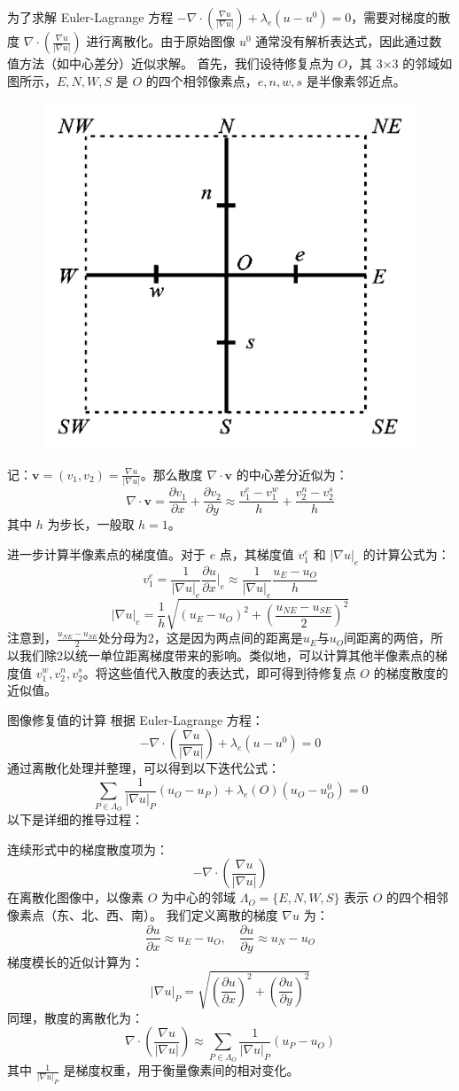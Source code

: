 \documentclass[UTF8]{ctexart}
\begin{document}
为了求解 Euler-Lagrange 方程 $-\nabla \cdot \left( \frac{\nabla u}{|\nabla u|} \right) + \lambda_e (u - u^0) = 0$，需要对梯度的散度 $\nabla \cdot \left( \frac{\nabla u}{|\nabla u|} \right)$ 进行离散化。由于原始图像 $u^0$ 通常没有解析表达式，因此通过数值方法（如中心差分）近似求解。
首先，我们设待修复点为 $O$，其 3×3 的邻域如图所示，$E, N, W, S$ 是 $O$ 的四个相邻像素点，$e, n, w, s$ 是半像素邻近点。
\begin{figure}[H]
    \centering
    \includegraphics[width=0.4\linewidth]{1.png}
    \label{fig:enter-label}
\end{figure}
记：$\mathbf{v} = \left( v_1, v_2 \right) = \frac{\nabla u}{|\nabla u|}$。那么散度 $\nabla \cdot \mathbf{v}$ 的中心差分近似为：
\[
\nabla \cdot \mathbf{v} = \frac{\partial v_1}{\partial x} + \frac{\partial v_2}{\partial y} \approx \frac{v_1^e - v_1^w}{h} + \frac{v_2^n - v_2^s}{h}
\]
其中 $h$ 为步长，一般取 $h = 1$。

进一步计算半像素点的梯度值。对于 $e$ 点，其梯度值 $v_1^e$ 和 $|\nabla u|_e$ 的计算公式为：
\[
v_1^e = \frac{1}{|\nabla u|_e} \frac{\partial u}{\partial x}\bigg|_e \approx \frac{1}{|\nabla u|_e} \frac{u_E - u_O}{h}
\]
\[
|\nabla u|_e = \frac{1}{h} \sqrt{(u_E - u_O)^2 + \left( \frac{u_{NE} - u_{SE}}{2} \right)^2}
\]
注意到，$\frac{u_{NE} - u_{SE}}{2}$处分母为2，这是因为两点间的距离是$u_E 与 u_O$间距离的两倍，所以我们除2以统一单位距离梯度带来的影响。类似地，可以计算其他半像素点的梯度值 $v_1^w, v_2^n, v_2^s$。将这些值代入散度的表达式，即可得到待修复点 $O$ 的梯度散度的近似值。

图像修复值的计算
根据 Euler-Lagrange 方程：
\[
-\nabla \cdot \left( \frac{\nabla u}{|\nabla u|} \right) + \lambda_e (u - u^0) = 0
\]
通过离散化处理并整理，可以得到以下迭代公式：
\[
\sum_{P \in \Lambda_O} \frac{1}{|\nabla u|_P}(u_O - u_P) + \lambda_e(O)(u_O - u^0_O) = 0
\]
以下是详细的推导过程：

连续形式中的梯度散度项为：
\[
-\nabla \cdot \left( \frac{\nabla u}{|\nabla u|} \right)
\]
在离散化图像中，以像素 $O$ 为中心的邻域 $\Lambda_O = \{E, N, W, S\}$ 表示 $O$ 的四个相邻像素点（东、北、西、南）。
我们定义离散的梯度 $\nabla u$ 为：
   \[
   \frac{\partial u}{\partial x} \approx u_E - u_O, \quad \frac{\partial u}{\partial y} \approx u_N - u_O
   \]
梯度模长的近似计算为：
   \[
   |\nabla u|_P = \sqrt{\left( \frac{\partial u}{\partial x} \right)^2 + \left( \frac{\partial u}{\partial y} \right)^2}
   \]
同理，散度的离散化为：
   \[
   \nabla \cdot \left( \frac{\nabla u}{|\nabla u|} \right) \approx \sum_{P \in \Lambda_O} \frac{1}{|\nabla u|_P} (u_P - u_O)
   \]
   其中 $\frac{1}{|\nabla u|_P}$ 是梯度权重，用于衡量像素间的相对变化。
\end{document}

